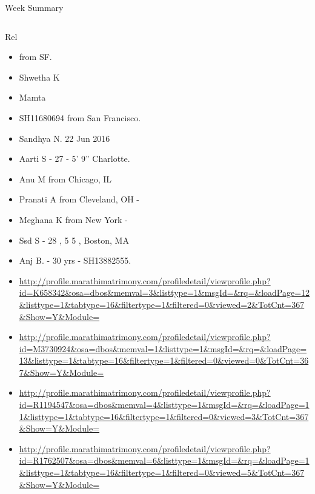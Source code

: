 \documentclass[serif, mathserif, final]{beamer}
\begin{document}
\begin{frame}
\begin{columns}
\begin{column}{0.5\linewidth}
\begin{block}{Week Summary}
\begin{column}{0.25\linewidth}
\begin{block}{Rel} 
  \begin{itemize} 
    \small \item \small  from SF. 
    \item \small Shwetha K 
    \item \small Mamta       
    \item \small SH11680694 from San Francisco. 
    \item \small Sandhya N. 22 Jun 2016 
    \item \small Aarti S - 27 - 5' 9'' Charlotte.       
    \item \small Anu M from Chicago, IL 
    \item \small Pranati A from Cleveland, OH - 
    \item \small Meghana K from New York - 
    \item \small Ssd S - 28 , 5 5 , Boston, MA 
    \item \small Anj B. - 30 yrs - SH13882555.
  \end{itemize} 


\begin{itemize}
\item \small
  \url{http://profile.marathimatrimony.com/profiledetail/viewprofile.php?id=K658342&osa=dbos&memval=3&listtype=1&msgId=&rq=&loadPage=12&listtype=1&tabtype=16&filtertype=1&filtered=0&viewed=2&TotCnt=367&Show=Y&Module=} 
\item \small \url{http://profile.marathimatrimony.com/profiledetail/viewprofile.php?id=M3730924&osa=dbos&memval=1&listtype=1&msgId=&rq=&loadPage=13&listtype=1&tabtype=16&filtertype=1&filtered=0&viewed=0&TotCnt=367&Show=Y&Module=}
  
\item \small \url{http://profile.marathimatrimony.com/profiledetail/viewprofile.php?id=R1194547&osa=dbos&memval=4&listtype=1&msgId=&rq=&loadPage=11&listtype=1&tabtype=16&filtertype=1&filtered=0&viewed=3&TotCnt=367&Show=Y&Module=}
  
\item \small \url{http://profile.marathimatrimony.com/profiledetail/viewprofile.php?id=R1762507&osa=dbos&memval=6&listtype=1&msgId=&rq=&loadPage=1&listtype=1&tabtype=16&filtertype=1&filtered=0&viewed=5&TotCnt=367&Show=Y&Module=}


\end{itemize}
\end{block}
\end{column}
\end{block}
\end{column}
\end{columns}
\end{frame}
\end{document}
